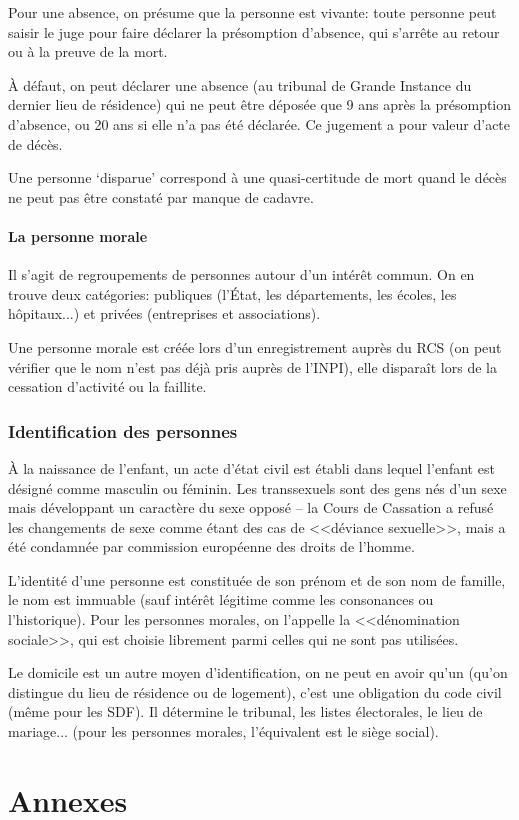 \documentclass[10pt,a4paper,french]{article}
\begin{document}
Pour une absence, on présume que la personne est vivante: toute personne peut saisir le juge pour faire déclarer la présomption d'absence, qui s'arrête au retour ou à la preuve de la mort.

À défaut, on peut déclarer une absence (au tribunal de Grande Instance du dernier lieu de résidence) qui ne peut être déposée que 9 ans après la présomption d'absence, ou 20 ans si elle n'a pas été déclarée. Ce jugement a pour valeur d'acte de décès.

Une personne `disparue' correspond à une quasi-certitude de mort quand le décès ne peut pas être constaté par manque de cadavre.

\subsection{La personne morale}

Il s'agit de regroupements de  personnes autour d'un intérêt commun. On en trouve deux catégories: publiques (l'État, les départements, les écoles, les hôpitaux...) et privées (entreprises et associations).

Une personne morale est créée lors d'un enregistrement auprès du RCS (on peut vérifier que le nom n'est pas déjà pris auprès de l'INPI), elle disparaît lors de la cessation d'activité ou la faillite.

\section{Identification des personnes}

À la naissance de l'enfant, un acte d'état civil est établi dans lequel l'enfant est désigné comme masculin ou féminin. Les transsexuels sont des gens nés d'un sexe mais développant un caractère du sexe opposé -- la Cours de Cassation a refusé les changements de sexe comme étant des cas de <<déviance sexuelle>>, mais a été condamnée par commission européenne des droits de l'homme.

L'identité d'une personne est constituée de son prénom et de son nom de famille, le nom est immuable (sauf intérêt légitime comme les consonances ou l'historique). Pour les personnes morales, on l'appelle la <<dénomination sociale>>, qui est choisie librement parmi celles qui ne sont pas utilisées.

Le domicile est un autre moyen d'identification, on ne peut en avoir qu'un (qu'on distingue du lieu de résidence ou de logement), c'est une obligation du code civil (même pour les SDF). Il détermine le tribunal, les listes électorales, le lieu de mariage... (pour les  personnes morales, l'équivalent est le siège social).  

\appendix
\part{Annexes}

\printindex
\printglossaries
\end{document}
